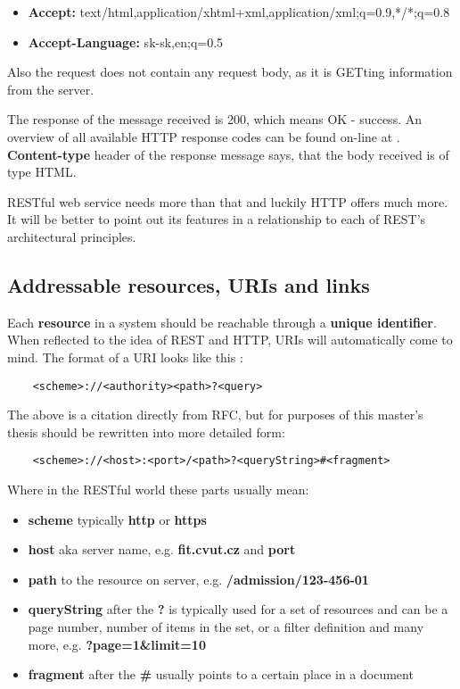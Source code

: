 	\begin{itemize}
	  \item \textbf{Accept:} text/html,application/xhtml+xml,application/xml;q=0.9,*/*;q=0.8
	  \item \textbf{Accept-Language:} sk-sk,en;q=0.5
	\end{itemize}
	
	Also the request does not contain any request body, as it is GETting information from the server. 
	
	The response of the message received is 200, which means OK - success. An overview of all available HTTP response codes
	can be found on-line at \cite{httpcodes}. \textbf{Content-type} header of the response message says, that the body
	received is of type HTML.
	
	RESTful web service needs more than that and luckily \gls{HTTP} offers much more. It will be better to point out its
	features in a relationship to each of REST's architectural principles.
	
	\subsection{Addressable resources, URIs and links}
	
	Each \textbf{resource} in a system should be reachable through a \textbf{unique identifier}. When reflected to the idea
	of REST and HTTP, URIs will automatically come to mind. The format of a URI looks like this \cite{uri}:
	
	\begin{verbatim}
	<scheme>://<authority><path>?<query>
	\end{verbatim}
	
	The above is a citation directly from RFC, but for purposes of this master's thesis should be rewritten into more
	detailed form:
	
	\begin{verbatim}
	<scheme>://<host>:<port>/<path>?<queryString>#<fragment>
	\end{verbatim}
	
	Where in the RESTful world these parts usually mean:
	\begin{itemize}
	  \item \textbf{scheme} typically \textbf{http} or \textbf{https}
	  \item \textbf{host} aka server name, e.g. \textbf{fit.cvut.cz} and \textbf{port}
	  \item \textbf{path} to the resource on server, e.g. \textbf{/admission/123-456-01}
	  \item \textbf{queryString} after the \textbf{?} is typically used for a set of resources and can be a page number,
	  number of items in the set, or a filter definition and many more, e.g. \textbf{?page=1\&limit=10}
	  \item \textbf{fragment} after the \textbf{\#} usually points to a certain place in a document
	\end{itemize}
	
